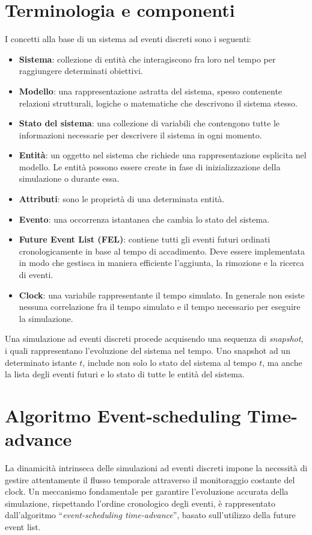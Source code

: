\documentclass[12pt,a4paper,openright,twoside]{book}
\begin{document}
\section{Terminologia e componenti}
I concetti alla base di un sistema ad eventi discreti sono i seguenti: 
\begin{itemize}
    \item \textbf{Sistema}: collezione di entità che interagiscono fra loro nel tempo per raggiungere determinati obiettivi.
    \item \textbf{Modello}: una rappresentazione astratta del sistema, spesso contenente relazioni strutturali, logiche o matematiche che descrivono il sistema stesso.
    \item \textbf{Stato del sistema}: una collezione di variabili che contengono tutte le informazioni necessarie per descrivere il sistema in ogni momento.
    \item \textbf{Entità}: un oggetto nel sistema che richiede una rappresentazione esplicita nel modello. Le entità possono essere create in fase di inizializzazione della simulazione o durante essa. 
    \item \textbf{Attributi}: sono le proprietà di una determinata entità.
    \item \textbf{Evento}: una occorrenza istantanea che cambia lo stato del sistema. 
    \item \textbf{Future Event List (FEL)}: contiene tutti gli eventi futuri ordinati cronologicamente in base al tempo di accadimento. Deve essere implementata in modo che gestisca in maniera efficiente l'aggiunta, la rimozione e la ricerca di eventi. 
    \item \textbf{Clock}: una variabile rappresentante il tempo simulato. In generale non esiste nessuna correlazione fra il tempo simulato e il tempo necessario per eseguire la simulazione. 
\end{itemize}
Una simulazione ad eventi discreti procede acquisendo una sequenza di \textit{snapshot}, i quali rappresentano l'evoluzione del sistema nel tempo. Uno snapshot ad un determinato istante $t$, include non solo lo stato del sistema al tempo $t$, ma anche la lista degli eventi futuri e lo stato di tutte le entità del sistema.

\section{Algoritmo Event-scheduling Time-advance}
\label{sec:time-advance-algorithm}
La dinamicità intrinseca delle simulazioni ad eventi discreti impone la necessità di gestire attentamente il flusso temporale attraverso il monitoraggio costante del clock. 
Un meccanismo fondamentale per garantire l'evoluzione accurata della simulazione, rispettando l'ordine cronologico degli eventi, è rappresentato dall'algoritmo ``\textit{event-scheduling time-advance}'', basato sull'utilizzo della future event list.
\end{document}
